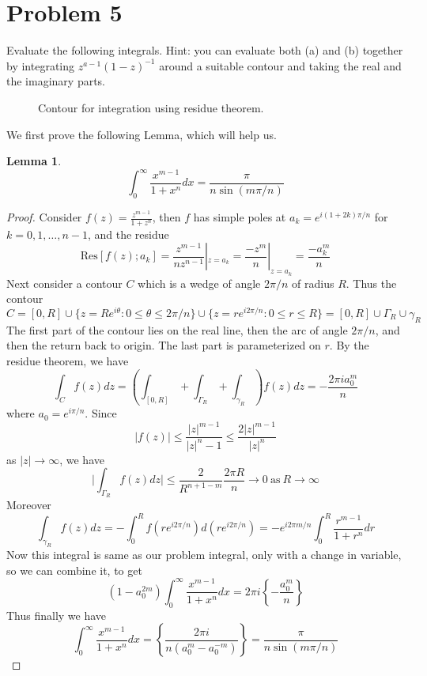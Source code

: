 \documentclass{article}[12pt]
\newtheorem{lem}{Lemma}
\begin{document}
\section*{Problem 5}Evaluate the following integrals.
Hint: you can evaluate both (a) and (b) together
by integrating $z^{a-1}(1-z)^{-1}$ around a suitable contour
and taking the real and the imaginary parts.

\begin{figure}[htb]
\begin{center}
\caption{Contour for integration using residue theorem.}
\label{fig:residue-contour}
\end{center}
\end{figure}


We first prove the following Lemma, which will help us.
\begin{lem}
\[
\int_0^\infty \frac{x^{m-1}}{1+x^n} dx = \frac{\pi}{n \sin(m\pi/n)}
\]
\end{lem}
\begin{proof}
Consider $f(z)=\frac{z^{m-1}}{1+z^n}$, then $f$ has simple poles
at $a_k=e^{i(1+2k)\pi/n}$ for $k=0,1,\ldots,n-1$, and the residue
\[
\mbox{Res}[f(z); a_k] = \frac{z^{m-1}}{nz^{n-1}}|_{z=a_k} = \frac{-z^m}{n}|_{z=a_k}
= \frac{-a_k^m}{n}
\]
Next consider a contour $C$ which is a wedge of angle $2\pi/n$ of radius
$R$. Thus the contour 
\[
C=[0,R] \cup \{z=Re^{i\theta}:0 \le \theta \le 2\pi/n\} \cup 
\{z=re^{i2\pi/n}: 0 \le r \le R\} = [0,R] \cup \Gamma_R \cup \gamma_R
\]
The first part of the contour lies on the real line, then the arc
of angle $2\pi/n$, and then the return back to origin. The last part
is parameterized on $r$.
By the residue theorem, we have
\[
\int_C f(z) dz = \left( \int_{[0,R]} + \int_{\Gamma_R} + \int_{\gamma_R}\right) f(z)dz
= -\frac{2\pi i a_0^m}{n}
\]
where $a_0=e^{i\pi/n}$.
Since 
\[
\lvert f(z)\rvert \le \frac{|z|^{m-1}}{|z|^n-1} \le \frac{2|z|^{m-1}}{|z|^n}
\] as $|z|\to\infty$, we have
\[
\lvert \int_{\Gamma_R} f(z) dz\rvert \le \frac{2}{R^{n+1-m}} \frac{2\pi R}{n} \to 0\ 
\mbox{as}\ R\to\infty
\]
Moreover
\[
\int_{\gamma_R} f(z)dz = - \int_0^R f(re^{i2\pi/n}) d(re^{i2\pi/n}) = 
-e^{i2\pi m/n}\int_0^R \frac{r^{m-1}}{1+r^n} dr
\]
Now this integral is same as our problem integral, only with
a change in variable, so we can combine it, to get
\[
(1-a_0^{2m}) \int_0^\infty \frac{x^{m-1}}{1+x^n} dx = 
2\pi i\left\{ -\frac{a_0^m}{n}\right\}
\]
Thus finally we have
\[
\int_0^\infty \frac{x^{m-1}}{1+x^n} dx = 
\left\{\frac{2\pi i}{n(a_0^m-a_0^{-m})}\right\}=
\frac{\pi}{n \sin(m\pi/n)}
\]
\end{proof}
\end{document}
